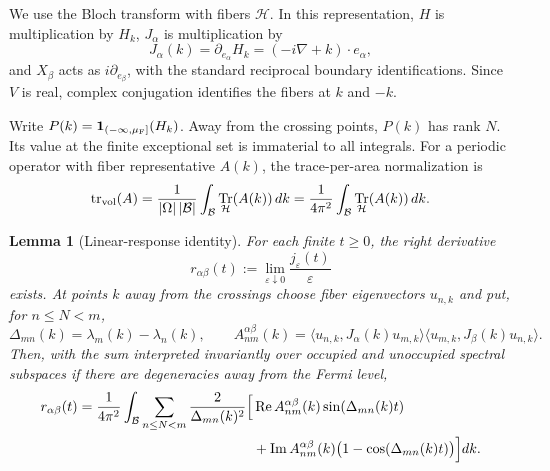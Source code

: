 \documentclass[11pt,a4paper]{article}
\DeclareMathOperator{\Tr}{Tr}
\DeclareMathOperator{\RePart}{Re}
\DeclareMathOperator{\ImPart}{Im}
\newcommand{\BZ}{\mathcal B}
\newcommand{\cH}{\mathcal H}
\newcommand{\ind}{\mathbf 1}
\newcommand{\trv}{\operatorname{tr}_{\rm vol}}
\newtheorem{lemma}{Lemma}
\begin{document}
We use the Bloch transform with fibers $\cH$. In this representation,
$H$ is multiplication by $H_k$, $J_\alpha$ is multiplication by
\[
 J_\alpha(k)=\partial_{e_\alpha}H_k=(-i\nabla+k)\cdot e_\alpha,
\]
and $X_\beta$ acts as $i\partial_{e_\beta}$, with the standard reciprocal
boundary identifications. Since $V$ is real, complex conjugation identifies
the fibers at $k$ and $-k$.

Write $P(k)=\ind_{(-\infty,\mu_{\rm F}]}(H_k)$. Away from the crossing points,
$P(k)$ has rank $N$. Its value at the finite exceptional set is immaterial to
all integrals. For a periodic operator with fiber representative $A(k)$,
the trace-per-area normalization is
\begin{equation}\label{eq:blochtrace}
 \trv(A)=\frac{1}{|\Omega|\,|\BZ|}
       \int_\BZ\Tr_{\cH}(A(k))\,dk
       =\frac1{4\pi^2}\int_\BZ\Tr_{\cH}(A(k))\,dk.
\end{equation}

\begin{lemma}[Linear-response identity]\label{lem:response}
For each finite $t\geq0$, the right derivative
\[
 r_{\alpha\beta}(t):=
 \lim_{\varepsilon\downarrow0}\frac{j_\varepsilon(t)}{\varepsilon}
\]
exists. At points $k$ away from the crossings choose fiber eigenvectors
$u_{n,k}$ and put, for $n\leq N<m$,
\[
 \Delta_{mn}(k)=\lambda_m(k)-\lambda_n(k),\qquad
 A_{nm}^{\alpha\beta}(k)=
 \langle u_{n,k},J_\alpha(k)u_{m,k}\rangle
 \langle u_{m,k},J_\beta(k)u_{n,k}\rangle.
\]
Then, with the sum interpreted invariantly over occupied and unoccupied
spectral subspaces if there are degeneracies away from the Fermi level,
\begin{equation}\label{eq:response}
 \begin{aligned}
 r_{\alpha\beta}(t)=\frac1{4\pi^2}\int_\BZ
 \sum_{n\leq N<m}\frac{2}{\Delta_{mn}(k)^2}
 \Bigl[&\RePart A_{nm}^{\alpha\beta}(k)\sin(\Delta_{mn}(k)t)\\
 &+\ImPart A_{nm}^{\alpha\beta}(k)
       \bigl(1-\cos(\Delta_{mn}(k)t)\bigr)\Bigr]dk.
 \end{aligned}
\end{equation}
\end{lemma}
\end{document}

